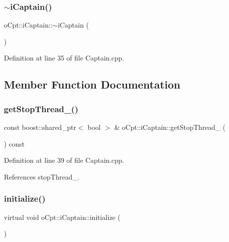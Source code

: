 \subsubsection{\texorpdfstring{$\sim$i\+Captain()}{~iCaptain()}}
{\footnotesize\ttfamily o\+Cpt\+::i\+Captain\+::$\sim$i\+Captain (\begin{DoxyParamCaption}{ }\end{DoxyParamCaption})\hspace{0.3cm}{\ttfamily [virtual]}}



Definition at line 35 of file Captain.\+cpp.



\subsection{Member Function Documentation}
\hypertarget{classo_cpt_1_1i_captain_ae59d378b21d0f385d0a8c4ade2768529}{}\label{classo_cpt_1_1i_captain_ae59d378b21d0f385d0a8c4ade2768529} 
\subsubsection{\texorpdfstring{get\+Stop\+Thread\+\_\+()}{getStopThread\_()}}
{\footnotesize\ttfamily const boost\+::shared\+\_\+ptr$<$ bool $>$ \& o\+Cpt\+::i\+Captain\+::get\+Stop\+Thread\+\_\+ (\begin{DoxyParamCaption}{ }\end{DoxyParamCaption}) const}



Definition at line 39 of file Captain.\+cpp.



References stop\+Thread\+\_\+.

\hypertarget{classo_cpt_1_1i_captain_a5ad7947dde7866981c76ccd3a30ce4ce}{}\label{classo_cpt_1_1i_captain_a5ad7947dde7866981c76ccd3a30ce4ce} 
\subsubsection{\texorpdfstring{initialize()}{initialize()}}
{\footnotesize\ttfamily virtual void o\+Cpt\+::i\+Captain\+::initialize (\begin{DoxyParamCaption}{ }\end{DoxyParamCaption})\hspace{0.3cm}{\ttfamily [pure virtual]}}



